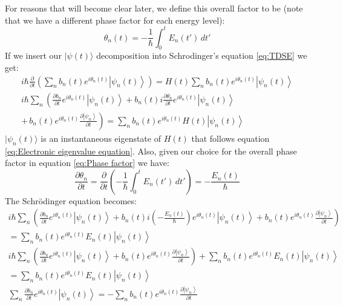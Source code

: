 \documentclass[11pt,a4paper]{article}
\begin{document}
For reasons that will become clear later, we define this overall factor to be (note that we have a different  phase factor for each energy level):
\begin{equation}
	\label{eq:Phase factor}
	\theta_n(t) = -\frac{1}{\hbar} \int_0^t E_n(t') \, dt'
\end{equation}
If we insert our $|\psi(t)\rangle$ decomposition into Schrodinger’s equation \eqref{eq:TDSE} we get:
\begin{equation*}
	\begin{gathered}
		i\hbar \frac{\partial}{\partial t} \left( \sum_n b_n(t) e^{i\theta_n(t)} \left|\psi_n(t)\right\rangle \right) = H(t) \sum_n b_n(t) e^{i\theta_n(t)} \left|\psi_n(t)\right\rangle \\[6pt]
		i\hbar \sum_n \left( \frac{\partial b_n}{\partial t} e^{i\theta_n(t)} \left|\psi_n(t)\right\rangle + b_n(t) i \frac{\partial \theta_n}{\partial t} e^{i\theta_n(t)} \left|\psi_n(t)\right\rangle \right. \\
		\left. + \, b_n(t) e^{i\theta_n(t)} \frac{\partial \left|\psi_n\right\rangle}{\partial t} \right) = \sum_n b_n(t) e^{i\theta_n(t)} H(t) \left|\psi_n(t)\right\rangle
	\end{gathered}
\end{equation*}
$|\psi_n(t)\rangle$ is an instantaneous eigenstate of $H(t)$ that follows equation \eqref{eq:Electronic eigenvalue equation}. Also, given our choice for the overall phase factor in equation \eqref{eq:Phase factor} we have:
\begin{equation*}
	\frac{\partial \theta_n}{\partial t} = \frac{\partial}{\partial t} \left( -\frac{1}{\hbar} \int_0^t E_n(t') \, dt' \right) = -\frac{E_n(t)}{\hbar}
\end{equation*}
The Schrödinger equation becomes:
\begin{equation*}
	\begin{gathered}
		i\hbar \sum_n \left( \frac{\partial b_n}{\partial t} e^{i\theta_n(t)} \left|\psi_n(t)\right\rangle + b_n(t) i \left(-\frac{E_n(t)}{\hbar}\right) e^{i\theta_n(t)} \left|\psi_n(t)\right\rangle + b_n(t) e^{i\theta_n(t)} \frac{\partial \left|\psi_n\right\rangle}{\partial t} \right) \\
		= \sum_n b_n(t) e^{i\theta_n(t)} E_n(t) \left|\psi_n(t)\right\rangle \\[6pt]
		i\hbar \sum_n \left( \frac{\partial b_n}{\partial t} e^{i\theta_n(t)} \left|\psi_n(t)\right\rangle + b_n(t) e^{i\theta_n(t)} \frac{\partial \left|\psi_n\right\rangle}{\partial t} \right) + \sum_n b_n(t) e^{i\theta_n(t)} E_n(t) \left|\psi_n(t)\right\rangle \\
		= \sum_n b_n(t) e^{i\theta_n(t)} E_n(t) \left|\psi_n(t)\right\rangle \\[6pt]
		\sum_n \frac{\partial b_n}{\partial t} e^{i\theta_n(t)} \left|\psi_n(t)\right\rangle = -\sum_n b_n(t) e^{i\theta_n(t)} \frac{\partial \left|\psi_n\right\rangle}{\partial t}
	\end{gathered}
\end{equation*}
\end{document}
